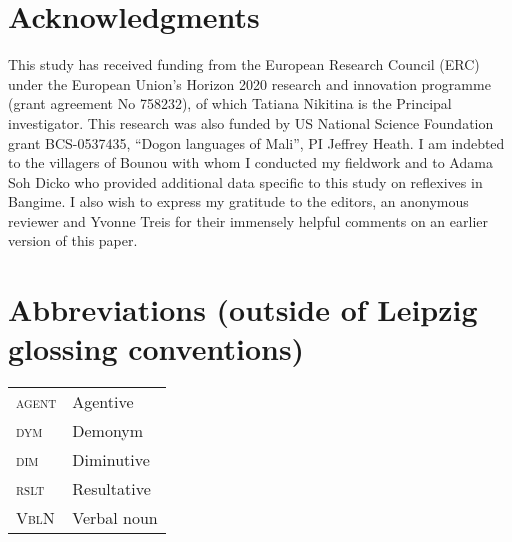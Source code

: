 \documentclass[output=paper]{langscibook}
\begin{document}
\section*{Acknowledgments}

This study has received funding from the European Research Council (ERC) under the European Union's Horizon 2020 research and innovation programme (grant agreement No 758232), of which Tatiana Nikitina is the Principal investigator. This research was also funded by US National Science Foundation grant BCS-0537435, ``Dogon languages of Mali'', PI Jeffrey Heath. I am indebted to the villagers of Bounou with whom I conducted my fieldwork and to Adama Soh Dicko who provided additional data specific to this study on reflexives in Bangime. I also wish to express my gratitude to the editors, an anonymous reviewer and Yvonne Treis for their immensely helpful comments on an earlier version of this paper.

\section*{Abbreviations (outside of Leipzig glossing conventions)}
\begin{tabularx}{.45\textwidth}{lQ}
	\textsc{agent} & Agentive \\
	\textsc{dym} & Demonym \\
	\textsc{dim} & Diminutive \\
	\textsc{rslt} & Resultative \\
	\textsc{VblN} & Verbal noun \\
\end{tabularx}

\pagebreak
\printbibliography[heading=subbibliography,notkeyword=this]
\end{document}
